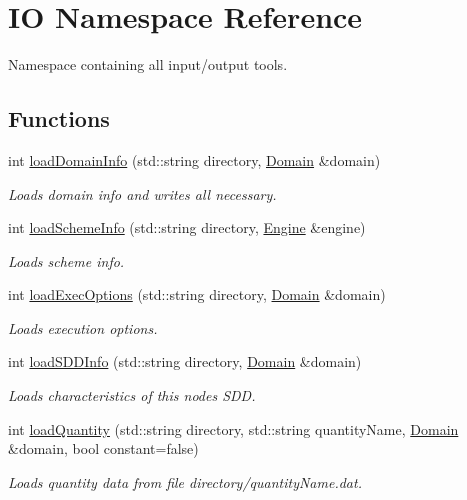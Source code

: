 \hypertarget{namespaceIO}{}\section{IO Namespace Reference}
\label{namespaceIO}


Namespace containing all input/output tools.  


\subsection*{Functions}
\begin{DoxyCompactItemize}
\item 
int \hyperlink{namespaceIO_ab1b5447a50be31c6e04b64a13c58a05d}{load\+Domain\+Info} (std\+::string directory, \hyperlink{classDomain}{Domain} \&domain)
\begin{DoxyCompactList}\small\item\em Loads domain info and writes all necessary. \end{DoxyCompactList}\item 
int \hyperlink{namespaceIO_acc60681d98975d0ce0d3580de4f70ecd}{load\+Scheme\+Info} (std\+::string directory, \hyperlink{classEngine}{Engine} \&engine)
\begin{DoxyCompactList}\small\item\em Loads scheme info. \end{DoxyCompactList}\item 
int \hyperlink{namespaceIO_ae9baa8f2d704798ba4b669718c5630c6}{load\+Exec\+Options} (std\+::string directory, \hyperlink{classDomain}{Domain} \&domain)
\begin{DoxyCompactList}\small\item\em Loads execution options. \end{DoxyCompactList}\item 
int \hyperlink{namespaceIO_a2d97d3a808e25f48fa483719b3927273}{load\+S\+D\+D\+Info} (std\+::string directory, \hyperlink{classDomain}{Domain} \&domain)
\begin{DoxyCompactList}\small\item\em Loads characteristics of this node\textquotesingle{}s S\+DD. \end{DoxyCompactList}\item 
int \hyperlink{namespaceIO_a47fb805af862597094a0d366736fadb2}{load\+Quantity} (std\+::string directory, std\+::string quantity\+Name, \hyperlink{classDomain}{Domain} \&domain, bool constant=false)
\begin{DoxyCompactList}\small\item\em Loads quantity data from file directory/quantity\+Name.\+dat. \end{DoxyCompactList}\item 

\end{DoxyCompactItemize}
